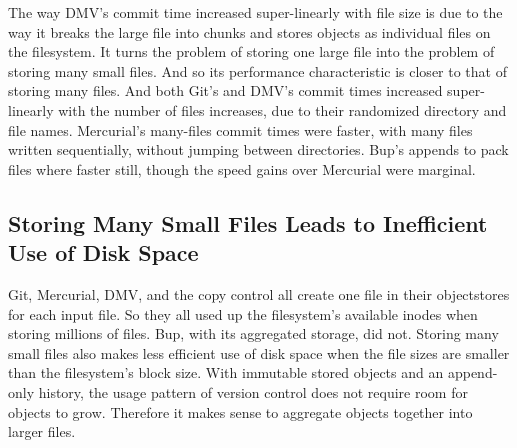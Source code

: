 The way DMV's commit time increased super-linearly with file size is due to the way it breaks the large file into chunks and stores objects as individual files on the filesystem.
It turns the problem of storing one large file into the problem of storing many small files.
And so its performance characteristic is closer to that of storing many files.
And both Git's and DMV's commit times increased super-linearly with the number of files increases, due to their randomized directory and file names.
Mercurial's many-files commit times were faster, with many files written sequentially, without jumping between directories.
Bup's appends to pack files where faster still, though the speed gains over Mercurial were marginal.


\subsection{Storing Many Small Files Leads to Inefficient Use of Disk Space}

Git, Mercurial, DMV, and the copy control all create one file in their \glspl{objectstore} for each input file.
So they all used up the filesystem's available inodes when storing millions of files.
Bup, with its aggregated storage, did not.
Storing many small files also makes less efficient use of disk space when the file sizes are smaller than the filesystem's block size.
With immutable stored objects and an append-only history, the usage pattern of version control does not require room for objects to grow.
Therefore it makes sense to aggregate objects together into larger files.

%
